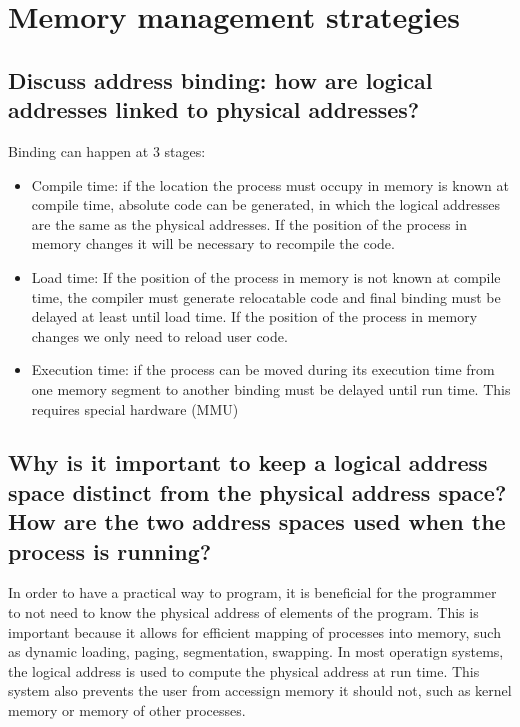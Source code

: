 \documentclass{article}
\begin{document}
\section{Memory management strategies}

\subsection{Discuss address binding: how are logical addresses linked to physical addresses?}
Binding can happen at 3 stages:
\begin{itemize}
    \item Compile time: if the location the process must occupy in memory is known at compile time, absolute code can be generated, in which the logical addresses are the same as the physical addresses. If the position of the process in memory changes it will be necessary to recompile the code.
    \item Load time: If the position of the process in memory is not known at compile time, the compiler must generate relocatable code and final binding must be delayed at least until load time. If the position of the process in memory changes we only need to reload user code.
    \item Execution time: if the process can be moved during its execution time from one memory segment to another binding must be delayed until run time. This requires special hardware (MMU)
\end{itemize}

\subsection{Why is it important to keep a logical address space distinct from the physical address space? How are the two address spaces used when the process is running?}
In order to have a practical way to program, it is beneficial for the programmer to not need to know the physical address of elements of the program. This is important because it allows for efficient mapping of processes into memory, such as dynamic loading, paging, segmentation, swapping. In most operatign systems, the logical address is used to compute the physical address at run time. This system also prevents the user from accessign memory it should not, such as kernel memory or memory of other processes.
\end{document}
